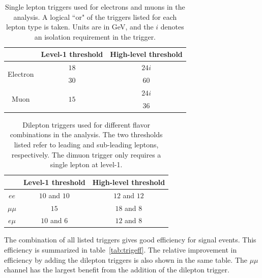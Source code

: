\begin{table}[h!]
\centering
\captionsetup{justification=centering}

\hspace{-10pt}
\begin{tabular}{|c|c|c|}
\hline
 & Level-1 threshold & High-level threshold \\ \hline \hline
\multirow{2}{*}{Electron} & $18$ & $24i$ \\ 
 & $30$ & $60$ \\ \hline

\multirow{2}{*}{Muon} & \multirow{2}{*}{$15$} & $24i$ \\ 
& & $36$ \\ 
 \hline

\end{tabular}

\caption{
Single lepton triggers used for electrons and muons in the \HWWfull analysis. A logical ``or" of the triggers listed for each lepton type is taken. Units are in GeV, and the $i$ denotes an isolation requirement in the trigger. 
}
\label{tab:single-lepton-trig}
\end{table}

\begin{table}[h!]
\centering
\captionsetup{justification=centering}

\hspace{-10pt}
\begin{tabular}{|c|c|c|}
\hline
 & Level-1 threshold & High-level threshold \\ \hline \hline
$ee$ & $10$ and $10$ & $12$ and $12$ \\ \hline
$\mu\mu$ & $15$ & $18$ and $8$ \\ \hline
$e\mu$ & $10$ and $6$ & $12$ and $8$ \\ \hline
\end{tabular}

\caption{
Dilepton triggers used for different flavor combinations in the \HWWfull analysis. The two thresholds listed refer to leading and sub-leading leptons, respectively. The dimuon trigger only requires a single lepton at level-1. 
}
\label{tab:dilepton-trig}
\end{table}

The combination of all listed triggers gives good efficiency for signal events. This efficiency is summarized in table~\ref{tab:trigeff}. The relative improvement in efficiency by adding the dilepton triggers is also shown in the same table. The $\mu\mu$ channel has the largest benefit from the addition of the dilepton trigger.


